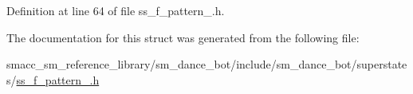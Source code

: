 Definition at line 64 of file ss\+\_\+f\+\_\+pattern\+\_.\+h.



The documentation for this struct was generated from the following file\+:\begin{DoxyCompactItemize}
\item 
smacc\+\_\+sm\+\_\+reference\+\_\+library/sm\+\_\+dance\+\_\+bot/include/sm\+\_\+dance\+\_\+bot/superstates/\hyperlink{ss__f__pattern__1_8h}{ss\+\_\+f\+\_\+pattern\+\_.\+h}\end{DoxyCompactItemize}
